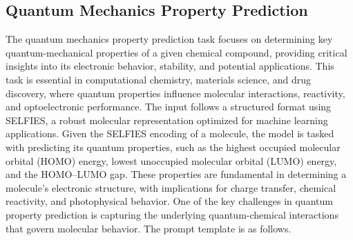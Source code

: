 \subsection{Quantum Mechanics Property Prediction}
The quantum mechanics property prediction task focuses on determining key quantum-mechanical properties of a given chemical compound, providing critical insights into its electronic behavior, stability, and potential applications. This task is essential in computational chemistry, materials science, and drug discovery, where quantum properties influence molecular interactions, reactivity, and optoelectronic performance.
The input follows a structured format using SELFIES, a robust molecular representation optimized for machine learning applications. Given the SELFIES encoding of a molecule, the model is tasked with predicting its quantum properties, such as the highest occupied molecular orbital (HOMO) energy, lowest unoccupied molecular orbital (LUMO) energy, and the HOMO–LUMO gap. These properties are fundamental in determining a molecule’s electronic structure, with implications for charge transfer, chemical reactivity, and photophysical behavior.
One of the key challenges in quantum property prediction is capturing the underlying quantum-chemical interactions that govern molecular behavior. The prompt template is as follows.


